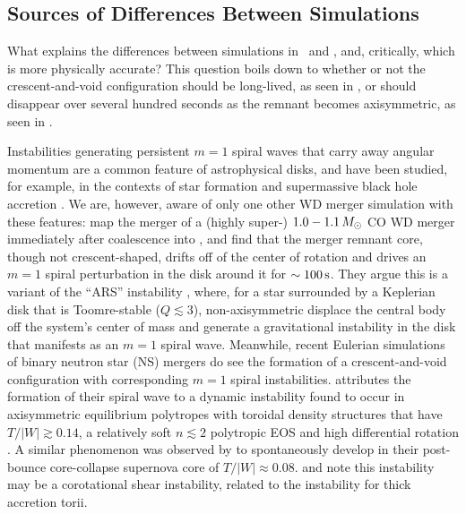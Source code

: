 
\subsection{Sources of Differences Between Simulations}
\label{ssec:c3_differences_merger_process}

What explains the differences between simulations in \gasoline\ and \arepo, and, critically, which is more physically accurate?  This question boils down to whether or not the crescent-and-void configuration should be long-lived, as seen in \arepo, or should disappear over several hundred seconds as the remnant becomes axisymmetric, as seen in \gasoline.

Instabilities generating persistent $m = 1$ spiral waves that carry away angular momentum are a common feature of astrophysical disks, and have been studied, for example, in the contexts of star formation \citep{adamrs89, shu+90, lin15, kratl16} and supermassive black hole accretion \citep{hopkq10}.  We are, however, aware of only one other WD merger simulation with these features: \citep{kash+15} map the merger of a (highly super-\Mch) $1.0-1.1\,\Msun$ CO WD merger immediately after coalescence into \flash, and find that the merger remnant core, though not crescent-shaped, drifts off of the center of rotation and drives an $m = 1$ spiral perturbation in the disk around it for $\sim100\,\mathrm{s}$.  They argue this is a variant of the ``ARS'' instability \citep{adamrs89, shu+90}, where, for a star surrounded by a Keplerian disk that is Toomre-stable ($Q \lesssim 3$), non-axisymmetric displace the central body off the system's center of mass and generate a gravitational instability in the disk that manifests as an $m = 1$ spiral wave.  Meanwhile, recent Eulerian simulations of binary neutron star (NS) mergers \citep{pasc+15, radibo16} do see the formation of a crescent-and-void configuration with corresponding $m = 1$ spiral instabilities.  \citep{pasc+15} attributes the formation of their spiral wave to a dynamic instability \citep{cent+11, saibs03} found to occur in axisymmetric equilibrium polytropes with toroidal density structures that have $T/|W| \gtrsim 0.14$, a relatively soft $n \lesssim 2$ polytropic EOS and high differential rotation \citep{saibs03}.  A similar phenomenon was observed by \cite{ott+05} to spontaneously develop in their post-bounce core-collapse supernova core of $T/|W| \approx 0.08$.  \cite{muhl+14} and \cite{wattaj05} note this instability may be a corotational shear instability, related to the \cite{papap84} instability for thick accretion torii.

